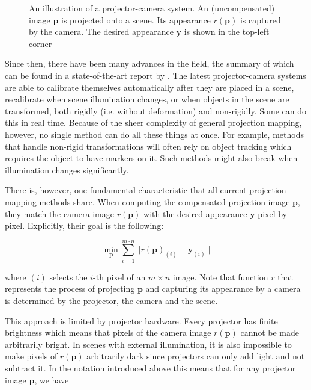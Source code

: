 \begin{figure}
    \centering
    \def\svgwidth{0.6\textwidth}
    
    \caption{An illustration of a projector-camera system. An (uncompensated) image \(\bm{p}\) is projected onto a scene. Its appearance \(r(\bm{p})\) is captured by the camera. The desired appearance \(\bm{y}\) is shown in the top-left corner}
    \label{fig:intro_procam}
\end{figure}

Since then, there have been many advances in the field, the summary of which can be found in a state-of-the-art report by \citet{Grundhofer2018}. The latest projector-camera systems are able to calibrate themselves automatically after they are placed in a scene, recalibrate when scene illumination changes, or when objects in the scene are transformed, both rigidly (i.e. without deformation) and non-rigidly. Some can do this in real time. Because of the sheer complexity of general projection mapping, however, no single method can do all these things at once. For example, methods that handle non-rigid transformations will often rely on object tracking which requires the object to have markers on it. Such methods might also break when illumination changes significantly.

There is, however, one fundamental characteristic that all current projection mapping methods share. When computing the compensated projection image \(\bm{p}\), they match the camera image \(r(\bm{p})\) with the desired appearance \(\bm{y}\) pixel by pixel. Explicitly, their goal is the following:

\begin{equation}
    \label{eq:projection_mapping-per_pixel}
    \min_{\bm{p}} \sum_{i=1}^{m \cdot n} || r(\bm{p})_{(i)} - \bm{y}_{(i)} ||
\end{equation}

where \((i)\) selects the \(i\)-th pixel of an \(m \times n\) image. Note that function \(r\) that represents the process of projecting \(\bm{p}\) and capturing its appearance by a camera is determined by the projector, the camera and the scene.

This approach is limited by projector hardware. Every projector has finite brightness which means that pixels of the camera image \(r(\bm{p})\) cannot be made arbitrarily bright. In scenes with external illumination, it is also impossible to make pixels of \(r(\bm{p})\) arbitrarily dark since projectors can only add light and not subtract it. In the notation introduced above this means that for any projector image \(\bm{p}\), we have

